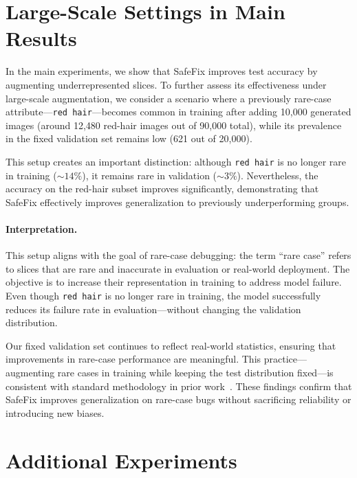 \documentclass[10pt]{article} %
\newcommand{\model}{SafeFix\xspace}
\begin{document}
\section{Large-Scale Settings in Main Results}
\label{sec:largescale}

In the main experiments,
 we show that \model improves test accuracy by augmenting underrepresented slices. To further assess its effectiveness under large-scale augmentation, we consider a scenario where a previously rare-case attribute—\texttt{red hair}—becomes common in training after adding 10{,}000 generated images (around 12{,}480 red-hair images out of 90{,}000 total), while its prevalence in the fixed validation set remains low (621 out of 20{,}000).

This setup creates an important distinction: although \texttt{red hair} is no longer rare in training (\(\sim14\%\)), it remains rare in validation (\(\sim3\%\)). Nevertheless, the accuracy on the red-hair subset improves significantly, demonstrating that \model effectively improves generalization to previously underperforming groups.

\paragraph{Interpretation.} This setup aligns with the goal of rare-case debugging: the term “rare case” refers to slices that are rare and inaccurate in evaluation or real-world deployment. The objective is to increase their representation in training to address model failure. Even though \texttt{red hair} is no longer rare in training, the model successfully reduces its failure rate in evaluation—without changing the validation distribution.

Our fixed validation set continues to reflect real-world statistics, ensuring that improvements in rare-case performance are meaningful. This practice—augmenting rare cases in training while keeping the test distribution fixed—is consistent with standard methodology in prior work~\citep{chen2023hibug}. These findings confirm that \model improves generalization on rare-case bugs without sacrificing reliability or introducing new biases.




\section{Additional Experiments}
\label{sec:additional-experiments}
\end{document}
